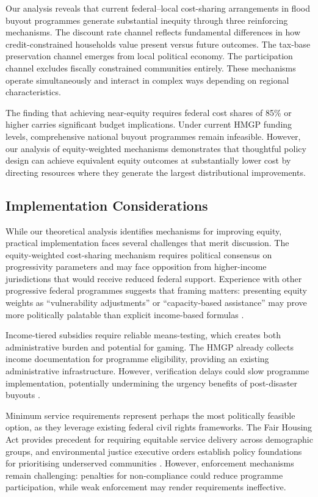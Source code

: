 \documentclass[preprint,12pt,authoryear]{elsarticle}
\begin{document}
Our analysis reveals that current federal--local cost-sharing arrangements in flood buyout programmes generate substantial inequity through three reinforcing mechanisms. The discount rate channel reflects fundamental differences in how credit-constrained households value present versus future outcomes. The tax-base preservation channel emerges from local political economy. The participation channel excludes fiscally constrained communities entirely. These mechanisms operate simultaneously and interact in complex ways depending on regional characteristics.

The finding that achieving near-equity requires federal cost shares of 85\% or higher carries significant budget implications. Under current HMGP funding levels, comprehensive national buyout programmes remain infeasible. However, our analysis of equity-weighted mechanisms demonstrates that thoughtful policy design can achieve equivalent equity outcomes at substantially lower cost by directing resources where they generate the largest distributional improvements.

\subsection{Implementation Considerations}

While our theoretical analysis identifies mechanisms for improving equity, practical implementation faces several challenges that merit discussion. The equity-weighted cost-sharing mechanism requires political consensus on progressivity parameters and may face opposition from higher-income jurisdictions that would receive reduced federal support. Experience with other progressive federal programmes suggests that framing matters: presenting equity weights as ``vulnerability adjustments'' or ``capacity-based assistance'' may prove more politically palatable than explicit income-based formulas \citep{banzhaf2019environmental}.

Income-tiered subsidies require reliable means-testing, which creates both administrative burden and potential for gaming. The HMGP already collects income documentation for programme eligibility, providing an existing administrative infrastructure. However, verification delays could slow programme implementation, potentially undermining the urgency benefits of post-disaster buyouts \citep{binder2016devil}.

Minimum service requirements represent perhaps the most politically feasible option, as they leverage existing federal civil rights frameworks. The Fair Housing Act provides precedent for requiring equitable service delivery across demographic groups, and environmental justice executive orders establish policy foundations for prioritising underserved communities \citep{bullard2005quest}. However, enforcement mechanisms remain challenging: penalties for non-compliance could reduce programme participation, while weak enforcement may render requirements ineffective.
\end{document}
